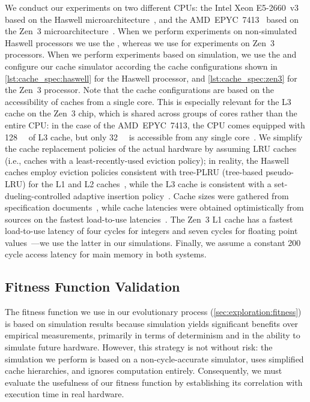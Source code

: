 We conduct our experiments on two different CPUs: the Intel Xeon E5-2660~v3~\cite{e52660} based on the Haswell microarchitecture~\cite{6762795}, and the AMD~EPYC~7413~\cite{epyc7413} based on the Zen~3 microarchitecture~\cite{9718180}. When we perform experiments on non-simulated Haswell processors we use the , whereas we use  for experiments on Zen~3 processors. When we perform experiments based on simulation, we use the  and configure our cache simulator according the cache configurations shown in \cref{lst:cache_spec:haswell} for the Haswell processor, and \cref{lst:cache_spec:zen3} for the Zen~3 processor. Note that the cache configurations are based on the accessibility of caches from a single core. This is especially relevant for the L3 cache on the Zen~3 chip, which is shared across groups of cores rather than the entire CPU: in the case of the AMD~EPYC~7413, the CPU comes equipped with \SI{128}{\mebi\byte} of L3 cache, but only \SI{32}{\mebi\byte} is accessible from any single core~\cite{9718180}. We simplify the cache replacement policies of the actual hardware by assuming LRU caches (i.e., caches with a least-recently-used eviction policy); in reality, the Haswell caches employ eviction policies consistent with tree-PLRU (tree-based pseudo-LRU) for the L1 and L2 caches~\cite{10.1145/3385412.3386008,10.1145/3297858.3304062}, while the L3 cache is consistent with a set-dueling-controlled adaptive insertion policy~\cite{4460516,10.1145/3297858.3304062}. Cache sizes were gathered from specification documents~\cite{amd19h,6762795}, while cache latencies were obtained optimistically from sources on the fastest load-to-use latencies~\cite{amd19h,hwbp}. The Zen~3 L1 cache has a fastest load-to-use latency of four cycles for integers and seven cycles for floating point values~\cite{amd19h}---we use the latter in our simulations. Finally, we assume a constant 200 cycle access latency for main memory in both systems.

\subsection{Fitness Function Validation}

\label{sec:res:fitval}

The fitness function we use in our evolutionary process (\cref{sec:exploration:fitness}) is based on simulation results because %
simulation yields significant benefits over empirical measurements, primarily in terms of determinism and in the ability to simulate future hardware. However, this strategy is not without risk: the simulation we perform is based on a non-cycle-accurate simulator, uses simplified cache hierarchies, and ignores computation entirely. %
Consequently, we must evaluate the usefulness of our fitness function by establishing its correlation with execution time in real hardware.

